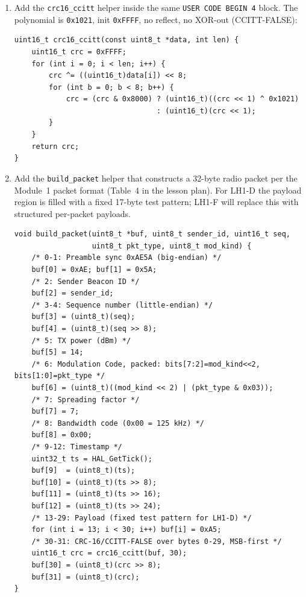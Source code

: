 \documentclass[11pt,letterpaper]{article}
\begin{document}
\begin{enumerate}[leftmargin=2em]
\begin{verbatim}
void rfm_set_mode_rx(void) {
    /* Reset FIFO RX pointer and enter RXCONTINUOUS */
    rfm_write_reg(0x0D, rfm_read_reg(0x0F));  // RegFifoAddrPtr = RxBase
    rfm_write_reg(0x12, 0xFF);                 // Clear all IRQ flags
    rfm_write_reg(0x01, 0x85);                 // LoRa RXCONTINUOUS
}
/* USER CODE END 4 */
\end{verbatim}

	\item Add the \texttt{crc16\_ccitt} helper inside the same \texttt{USER CODE BEGIN 4} block. The polynomial is \texttt{0x1021}, init \texttt{0xFFFF}, no reflect, no XOR-out (CCITT-FALSE):
\begin{verbatim}
uint16_t crc16_ccitt(const uint8_t *data, int len) {
    uint16_t crc = 0xFFFF;
    for (int i = 0; i < len; i++) {
        crc ^= ((uint16_t)data[i]) << 8;
        for (int b = 0; b < 8; b++) {
            crc = (crc & 0x8000) ? (uint16_t)((crc << 1) ^ 0x1021)
                                 : (uint16_t)(crc << 1);
        }
    }
    return crc;
}
\end{verbatim}

	\newpage
	\item Add the \texttt{build\_packet} helper that constructs a 32-byte radio packet per the Module~1 packet format (Table~4 in the lesson plan). For LH1-D the payload region is filled with a fixed 17-byte test pattern; LH1-F will replace this with structured per-packet payloads.
\begin{verbatim}
void build_packet(uint8_t *buf, uint8_t sender_id, uint16_t seq,
                  uint8_t pkt_type, uint8_t mod_kind) {
    /* 0-1: Preamble sync 0xAE5A (big-endian) */
    buf[0] = 0xAE; buf[1] = 0x5A;
    /* 2: Sender Beacon ID */
    buf[2] = sender_id;
    /* 3-4: Sequence number (little-endian) */
    buf[3] = (uint8_t)(seq);
    buf[4] = (uint8_t)(seq >> 8);
    /* 5: TX power (dBm) */
    buf[5] = 14;
    /* 6: Modulation Code, packed: bits[7:2]=mod_kind<<2, bits[1:0]=pkt_type */
    buf[6] = (uint8_t)((mod_kind << 2) | (pkt_type & 0x03));
    /* 7: Spreading factor */
    buf[7] = 7;
    /* 8: Bandwidth code (0x00 = 125 kHz) */
    buf[8] = 0x00;
    /* 9-12: Timestamp */
    uint32_t ts = HAL_GetTick();
    buf[9]  = (uint8_t)(ts);
    buf[10] = (uint8_t)(ts >> 8);
    buf[11] = (uint8_t)(ts >> 16);
    buf[12] = (uint8_t)(ts >> 24);
    /* 13-29: Payload (fixed test pattern for LH1-D) */
    for (int i = 13; i < 30; i++) buf[i] = 0xA5;
    /* 30-31: CRC-16/CCITT-FALSE over bytes 0-29, MSB-first */
    uint16_t crc = crc16_ccitt(buf, 30);
    buf[30] = (uint8_t)(crc >> 8);
    buf[31] = (uint8_t)(crc);
}
\end{verbatim}
	

\end{enumerate}
\end{document}
